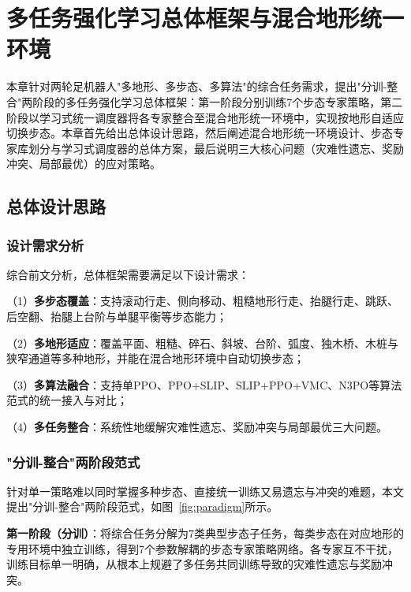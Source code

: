 
\chapter[多任务强化学习总体框架与混合地形统一环境]{多任务强化学习总体框架与混合地形统一环境}
\label{cha:framework}

本章针对两轮足机器人"多地形、多步态、多算法"的综合任务需求，提出"分训-整合"两阶段的多任务强化学习总体框架：第一阶段分别训练7个步态专家策略，第二阶段以学习式统一调度器将各专家整合至混合地形统一环境中，实现按地形自适应切换步态。本章首先给出总体设计思路，然后阐述混合地形统一环境设计、步态专家库划分与学习式调度器的总体方案，最后说明三大核心问题（灾难性遗忘、奖励冲突、局部最优）的应对策略。

\section{总体设计思路}

\subsection{设计需求分析}

综合前文分析，总体框架需要满足以下设计需求：

（1）\textbf{多步态覆盖}：支持滚动行走、侧向移动、粗糙地形行走、抬腿行走、跳跃、后空翻、抬腿上台阶与单腿平衡等步态能力；

（2）\textbf{多地形适应}：覆盖平面、粗糙、碎石、斜坡、台阶、弧度、独木桥、木桩与狭窄通道等多种地形，并能在混合地形环境中自动切换步态；

（3）\textbf{多算法融合}：支持单PPO、PPO+SLIP、SLIP+PPO+VMC、N3PO等算法范式的统一接入与对比；

（4）\textbf{多任务整合}：系统性地缓解灾难性遗忘、奖励冲突与局部最优三大问题。

\subsection{"分训-整合"两阶段范式}

针对单一策略难以同时掌握多种步态、直接统一训练又易遗忘与冲突的难题，本文提出"分训-整合"两阶段范式，如图~\ref{fig:paradigm}所示。

\textbf{第一阶段（分训）}：将综合任务分解为7类典型步态子任务，每类步态在对应地形的专用环境中独立训练，得到7个参数解耦的步态专家策略网络。各专家互不干扰，训练目标单一明确，从根本上规避了多任务共同训练导致的灾难性遗忘与奖励冲突。

